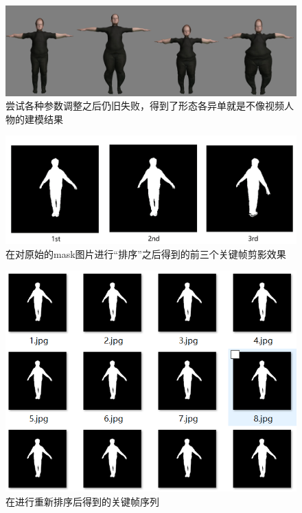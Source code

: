 \documentclass{article}
\begin{document}
\begin{figure}
	\centering
	\includegraphics[width=14cm]{figure/failure_2.png}
	\caption{尝试各种参数调整之后仍旧失败，得到了形态各异单就是不像视频人物的建模结果}
	\label{failure_2}
\end{figure}


\begin{figure}
	\centering
	\includegraphics[width=15cm]{figure/frame_mismatch.png}
	\caption{在对原始的mask图片进行“排序”之后得到的前三个关键帧剪影效果}
	\label{mask_mismatch}
\end{figure}

\begin{figure}
	\centering
	\includegraphics[width=14cm]{figure/frame_wrong_order.png}
	\caption{在进行重新排序后得到的关键帧序列}
	\label{frame_order}
\end{figure}
\end{document}
